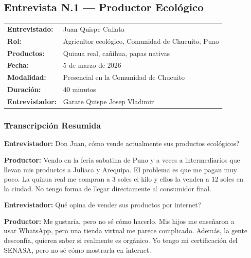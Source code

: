 \documentclass[12pt,a4paper]{article}
\begin{document}
\subsection{Entrevista N.\textdegree{}1 --- Productor Ecol\'ogico}

\begin{center}
\begin{tabular}{|L{3.8cm}|L{9.7cm}|}
\hline
{}
 \\
\hline
\textbf{Entrevistado:}  & Juan Quispe Callata \\
\hline
\textbf{Rol:}           & Agricultor ecol\'ogico, Comunidad de Chucuito, Puno \\
\hline
\textbf{Productos:}     & Quinua real, ca\~nihua, papas nativas \\
\hline
\textbf{Fecha:}         & 5 de marzo de 2026 \\
\hline
\textbf{Modalidad:}     & Presencial en la Comunidad de Chucuito \\
\hline
\textbf{Duraci\'on:}    & 40 minutos \\
\hline
\textbf{Entrevistador:} & Garate Quispe Josep Vladimir \\
\hline
\end{tabular}
\end{center}

\subsubsection{Transcripci\'on Resumida}

\textbf{Entrevistador:} Don Juan, \textquestiondown c\'omo vende actualmente sus productos ecol\'ogicos?

\textbf{Productor:} Vendo en la feria sabatina de Puno y a veces a intermediarios que
llevan mis productos a Juliaca y Arequipa. El problema es que me pagan muy poco.
La quinua real me compran a 3 soles el kilo y ellos la venden a 12 soles en la ciudad.
No tengo forma de llegar directamente al consumidor final.

\textbf{Entrevistador:} \textquestiondown Qu\'e opina de vender sus productos por internet?

\textbf{Productor:} Me gustar\'ia, pero no s\'e c\'omo hacerlo. Mis hijos me ense\~naron a
usar WhatsApp, pero una tienda virtual me parece complicado. Adem\'as, la gente
desconf\'ia, quieren saber si realmente es org\'anico. Yo tengo mi certificaci\'on del
SENASA, pero no s\'e c\'omo mostrarla en internet.
\end{document}
